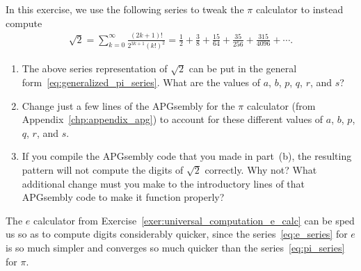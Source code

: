 \begin{multicols}{2}
\begin{problemstar}
	\end{problemstar}
	
	
	\mfilbreak
	
	
	\begin{problem}\label{exer:universal_computation_sqrt2_calc}
		In this exercise, we use the following series to tweak the $\pi$ calculator to instead compute
		\begin{align*}
			\sqrt{2} = \sum_{k=0}^\infty \frac{(2k+1)!}{2^{3k+1}(k!)^2 } = \frac{1}{2} +\frac{3}{8} + \frac{15}{64} + \frac{35}{256} + \frac{315}{4096} + \cdots.
		\end{align*}
		
		\begin{enumerate}[label=\bf\color{ocre}(\alph*)]
			\item The above series representation of $\sqrt{2}$ can be put in the general form~\eqref{eq:generalized_pi_series}. What are the values of $a$, $b$, $p$, $q$, $r$, and $s$?
			
			\item Change just a few lines of the APGsembly for the $\pi$ calculator (from Appendix~\ref{chp:appendix_apg}) to account for these different values of $a$, $b$, $p$, $q$, $r$, and $s$.
			
			\item If you compile the APGsembly code that you made in part~(b), the resulting pattern will not compute the digits of $\sqrt{2}$ correctly. Why not? What additional change must you make to the introductory lines of that APGsembly code to make it function properly?
		\end{enumerate}
	\end{problem}
	
	
	\mfilbreak
	
	
	\begin{problem}\label{exer:universal_computation_fast_e_calc}
		The $e$ calculator from Exercise~\ref{exer:universal_computation_e_calc} can be sped us so as to compute digits considerably quicker, since the series~\eqref{eq:e_series} for $e$ is so much simpler and converges so much quicker than the series~\eqref{eq:pi_series} for $\pi$.
		

\end{problem}
\end{multicols}
